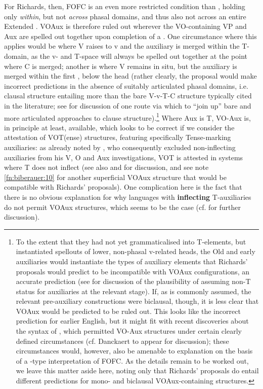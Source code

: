 \documentclass[output=paper]{LSP/langsci}
\begin{document}
For Richards, then, FOFC is an even more restricted condition than , holding only \textit{within}, but not \textit{across} phasal domains, and thus also not across an entire Extended . VOAux is therefore ruled out wherever the VO-containing VP and Aux are spelled out together upon completion of a . One circumstance where this applies would be where V raises to v and the auxiliary is merged within the T-domain, as the v- and T-space will always be spelled out together at the point where C is merged; another is where V remains in situ, but the auxiliary is merged within the first , below the  head (rather clearly, the proposal would make incorrect predictions in the absence of suitably articulated phasal domains, i.e. clausal structure entailing more than the bare V-v-T-C structure typically cited in the  literature; see \citealt{BiberauerRoberts2015} for discussion of one route via which to “join up” bare  and more articulated approaches to clause structure).\footnote{To the extent that they had not yet grammaticalised into T-elements, but instantiated spellouts of lower, non-phasal v-related heads, the Old and early  auxiliaries would instantiate the types of auxiliary elements that Richards’ proposals would predict to be incompatible with VOAux configurations, an accurate prediction (see \citealt{BiberauerRoberts2010} for discussion of the plausibility of assuming non-T status for auxiliaries at the relevant stage). If, as is commonly assumed, the relevant pre-auxiliary constructions were biclausal, though, it is less clear that VOAux would be predicted to be ruled out. This looks like the incorrect prediction for earlier English, but it might fit with recent discoveries about the syntax of , which permitted VO-Aux structures under certain clearly defined circumstances (cf. Danckaert to appear for discussion); these circumstances would, however, also be amenable to explanation on the basis of a -type interpretation of FOFC. As the details remain to be worked out, we leave this matter aside here, noting only that Richards’ proposals do entail different predictions for mono- and biclausal VOAux-containing structures.}  Where Aux is T, VO-Aux is, in principle at least, available, which looks to be correct if we consider the attestation of VOT(ense) structures, featuring specifically Tense-marking auxiliaries: as already noted by \citet{greenberg1963}, who consequently excluded non-inflecting auxiliaries from his V, O and Aux investigations, VOT is attested in systems where T does not inflect (see also \citealt{Dryer1992} and \citealt{Biberauer2017optionalv2} for discussion, and see note \ref{fn:biberauer:10} for another superficial VOAux structure that would be compatible with Richards’ proposals). One complication here is the fact that there is no obvious explanation for why languages with \textbf{inflecting} T-auxiliaries do not permit VOAux structures, which seems to be the case (cf. \citealt{Biberauer2017optionalv2} for further discussion).
\end{document}
